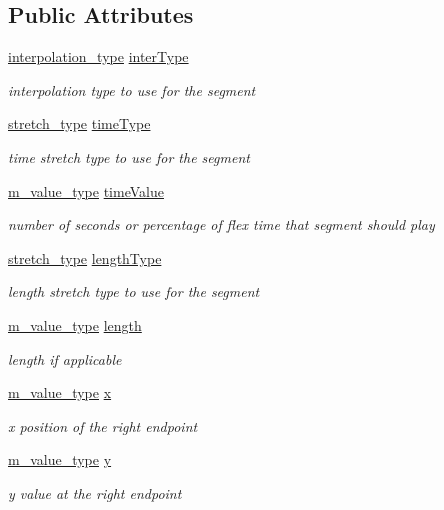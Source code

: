 \subsection*{Public Attributes}
\begin{CompactItemize}
\item 
\hyperlink{Types_8h_a13}{interpolation\_\-type} \hyperlink{structenvelope__segment_o0}{inter\-Type}
\begin{CompactList}\small\item\em interpolation type to use for the segment \item\end{CompactList}\item 
\hyperlink{Types_8h_a12}{stretch\_\-type} \hyperlink{structenvelope__segment_o1}{time\-Type}
\begin{CompactList}\small\item\em time stretch type to use for the segment \item\end{CompactList}\item 
\hyperlink{Types_8h_a3}{m\_\-value\_\-type} \hyperlink{structenvelope__segment_o2}{time\-Value}
\begin{CompactList}\small\item\em number of seconds or percentage of flex time that segment should play \item\end{CompactList}\item 
\hyperlink{Types_8h_a12}{stretch\_\-type} \hyperlink{structenvelope__segment_o3}{length\-Type}
\begin{CompactList}\small\item\em length stretch type to use for the segment \item\end{CompactList}\item 
\hyperlink{Types_8h_a3}{m\_\-value\_\-type} \hyperlink{structenvelope__segment_o4}{length}
\begin{CompactList}\small\item\em length if applicable \item\end{CompactList}\item 
\hyperlink{Types_8h_a3}{m\_\-value\_\-type} \hyperlink{structenvelope__segment_o5}{x}
\begin{CompactList}\small\item\em x position of the right endpoint \item\end{CompactList}\item 
\hyperlink{Types_8h_a3}{m\_\-value\_\-type} \hyperlink{structenvelope__segment_o6}{y}
\begin{CompactList}\small\item\em y value at the right endpoint \item\end{CompactList}\end{CompactItemize}


